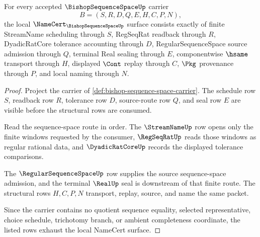 \begin{theorem}
\label{thm:bishop-sequence-space-namecert-obligations}
For every accepted $\BishopSequenceSpaceUp$ carrier
$$
B=(S,R,D,Q,E,H,C,P,N),
$$
the local $\NameCert_{\BishopSequenceSpaceUp}$ surface consists exactly of finite StreamName scheduling through $S$, RegSeqRat readback through $R$, DyadicRatCore tolerance accounting through $D$, RegularSequenceSpace source admission through $Q$, terminal Real sealing through $E$, componentwise $\hsame$ transport through $H$, displayed $\Cont$ replay through $C$, $\Pkg$ provenance through $P$, and local naming through $N$.
\end{theorem}
\begin{proof}
Project the carrier of \autoref{def:bishop-sequence-space-carrier}. The schedule row $S$, readback row $R$, tolerance row $D$, source-route row $Q$, and seal row $E$ are visible before the structural rows are consumed.

Read the sequence-space route in order. The $\StreamNameUp$ row opens only the finite windows requested by the consumer, $\RegSeqRatUp$ reads those windows as regular rational data, and $\DyadicRatCoreUp$ records the displayed tolerance comparisons.

The $\RegularSequenceSpaceUp$ row supplies the source sequence-space admission, and the terminal $\RealUp$ seal is downstream of that finite route. The structural rows $H,C,P,N$ transport, replay, source, and name the same packet.

Since the carrier contains no quotient sequence equality, selected representative, choice schedule, trichotomy branch, or ambient completeness coordinate, the listed rows exhaust the local NameCert surface.
\end{proof}

